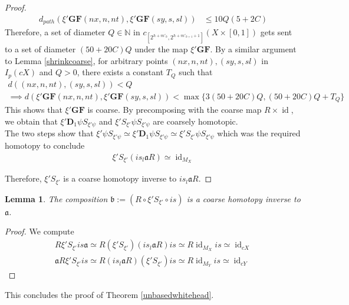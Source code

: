 \documentclass[a4paper,11pt]{article}
\theoremstyle{definition}
\theoremstyle{plain}
\newtheorem{lemma}[definition]{Lemma}
\theoremstyle{remark}
\DeclareMathOperator{\id}{id}
\begin{document}
{\begin{proof}
\begin{align*}
d_{path}(\xi'\mathbf{GF}(nx,n,nt),\xi'\mathbf{GF}(sy,s,sl))&\leq 10Q(5+2C)
\end{align*}
Therefore, a set of diameter $Q\in \mathbb{N}$ in $c_{[2^{h+m'_{h}},2^{h+m'_{h+1}+1}]}(X \times [0,1])$ gets sent to a set of diameter $(50+20C)Q$ under the map $\xi' \mathbf{GF}$. By a similar argument to Lemma \ref{shrinkcoarse}, for arbitrary points $(nx,n,nt),(sy,s,sl)$ in $I_{p}(cX)$ and $Q>0$, there exists a constant $T_{Q}$ such that 
\begin{align*}
d((nx,n,nt),(sy,s,sl))<Q \\
\implies d(\xi' \mathbf{GF}(nx,n,nt),\xi'  \mathbf{GF}(sy,s,sl)) < \max\{3(50+20C)Q, (50+20C)Q+T_{Q}\}
\end{align*} This shows that $\xi' \mathbf{GF}$ is coarse. By precomposing with the coarse map $R \times \id$, we obtain that $\xi' \mathbf{D}_{1} \psi S_{\xi' \psi}$ and $\xi' S_{\xi'} \psi S_{\xi' \psi}$ are coarsely homotopic. \\

The two steps show that $\xi' \psi S_{\xi'\psi}\simeq \xi' \mathbf{D}_{1} \psi S_{\xi' \psi}\simeq \xi' S_{\xi'} \psi S_{\xi' \psi}$ which was the required homotopy to conclude 
\begin{align*}
\xi' S_{\xi'} (is_{l}\mathfrak{a}R) \simeq \id_{M_{X}}
\end{align*}

Therefore, $\xi' S_{\xi'}$ is a coarse homotopy inverse to $is_{l}\mathfrak{a}R$. 
\end{proof}

\begin{lemma} \label{defb} The composition $\mathfrak{b}:=(R \circ \xi' S_{\xi'}\circ is)$ is a coarse homotopy inverse to $\mathfrak{a}$.
\end{lemma}

\begin{proof} We compute
\begin{align*}
R \xi' S_{\xi'} is \mathfrak{a}  \simeq R(\xi' S_{\xi'})(is_{l}\mathfrak{a}R) is \simeq R \id_{M_{X}} is \simeq \id_{cX}\\
\mathfrak{a} R \xi' S_{\xi'} is \simeq R(is_{l}\mathfrak{a}R) (\xi' S_{\xi'}) is \simeq R \id_{M_{Y}}is \simeq \id_{cY}
\end{align*}
\end{proof}

This concludes the proof of Theorem \ref{unbasedwhitehead}. \\

}
\end{document}
